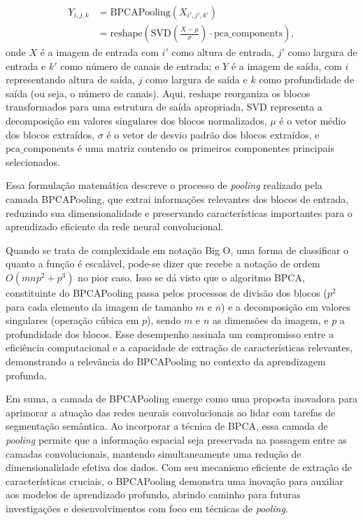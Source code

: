 \begin{equation}
    \label{project:eq:bpca}
    \begin{split}
        Y_{i,j,k} &= \text{BPCAPooling}(X_{i',j',k'}) \\
                  &= \text{reshape}\left(\text{SVD}\left(\frac{{X - \mu}}{{\sigma}}\right) \cdot \text{pca\_components}\right),
    \end{split}
\end{equation}
onde $X$ é a imagem de entrada com $i'$ como altura de entrada, $j'$ como largura de entrada e $k'$ como número de canais de entrada; e $Y$ é a imagem de saída, com $i$ representando altura de saída, $j$ como largura de saída e $k$ como profundidade de saída (ou seja, o número de canais). Aqui, $\text{reshape}$ reorganiza os blocos transformados para uma estrutura de saída apropriada, $\text{SVD}$ representa a decomposição em valores singulares dos blocos normalizados, $\mu$ é o vetor médio dos blocos extraídos, $\sigma$ é o vetor de desvio padrão dos blocos extraídos, e $\text{pca\_components}$ é uma matriz contendo os primeiros componentes principais selecionados.

Essa formulação matemática descreve o processo de \textit{pooling} realizado pela camada BPCAPooling, que extrai informações relevantes dos blocos de entrada, reduzindo sua dimensionalidade e preservando características importantes para o aprendizado eficiente da rede neural convolucional.

Quando se trata de complexidade em notação Big O, uma forma de classificar o quanto a função é escalável, pode-se dizer que recebe a notação de ordem $O(mnp^2 + p^3)$ no pior caso. Isso se dá visto que o algoritmo BPCA, constituinte do BPCAPooling passa pelos processos de divisão dos blocos ($p^2$ para cada elemento da imagem de tamanho $m$ e $n$) e a decomposição em valores singulares (operação cúbica em $p$), sendo $m$ e $n$ as dimensões da imagem, e $p$ a profundidade dos blocos. Esse desempenho assinala um compromisso entre a eficiência computacional e a capacidade de extração de características relevantes, demonstrando a relevância do BPCAPooling no contexto da aprendizagem profunda.

Em suma, a camada de BPCAPooling emerge como uma proposta inovadora para aprimorar a atuação das redes neurais convolucionais ao lidar com tarefas de segmentação semântica. Ao incorporar a técnica de BPCA, essa camada de \textit{pooling} permite que a informação espacial seja preservada na passagem entre as camadas convolucionais, mantendo simultaneamente uma redução de dimensionalidade efetiva dos dados. Com seu mecanismo eficiente de extração de características cruciais, o BPCAPooling demonstra uma inovação para auxiliar aos modelos de aprendizado profundo, abrindo caminho para futuras investigações e desenvolvimentos com foco em técnicas de \textit{pooling}.

